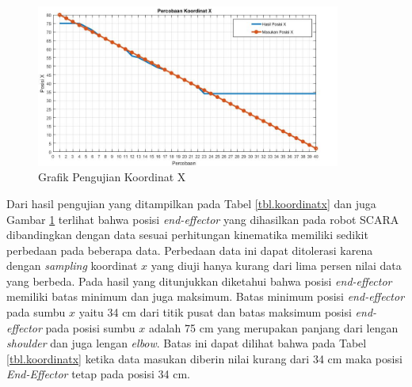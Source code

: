 	\begin{figure}[H]
	\centering
	\includegraphics[width=10cm]{gambar/pic_koordinatx.jpg}
	\caption{Grafik Pengujian Koordinat X}
	\label{pic.koordinatx}
\end{figure}

Dari hasil pengujian yang ditampilkan pada Tabel \ref{tbl.koordinatx} dan juga Gambar \ref{pic.koordinatx} terlihat bahwa posisi \textit{end-effector} yang dihasilkan pada robot SCARA dibandingkan dengan data sesuai perhitungan kinematika memiliki sedikit perbedaan pada beberapa data. Perbedaan data ini dapat ditolerasi karena dengan \textit{sampling} koordinat $x$ yang diuji hanya kurang dari lima persen nilai data yang berbeda. Pada hasil yang ditunjukkan diketahui bahwa posisi \textit{end-effector} memiliki batas minimum dan juga maksimum. Batas minimum posisi \textit{end-effector} pada sumbu $x$ yaitu 34 cm dari titik pusat dan batas maksimum posisi \textit{end-effector} pada posisi sumbu $x$ adalah 75 cm yang merupakan panjang dari lengan \textit{shoulder} dan juga lengan \textit{elbow}. Batas ini dapat dilihat bahwa pada Tabel \ref{tbl.koordinatx} ketika data masukan diberin nilai kurang dari 34 cm maka posisi \textit{End-Effector} tetap pada posisi 34 cm.

